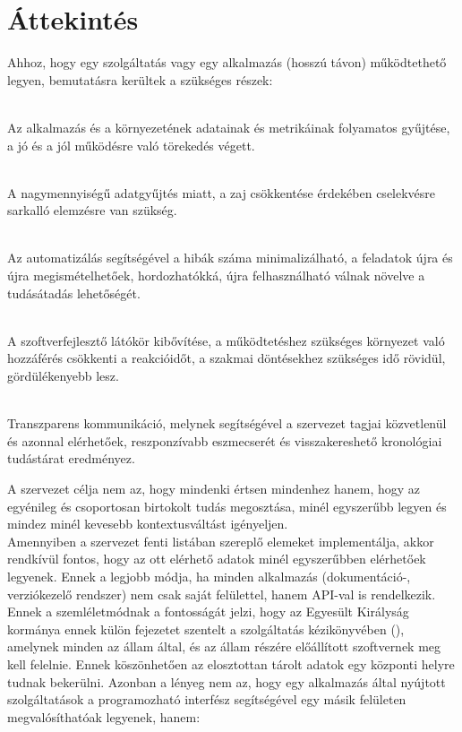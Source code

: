 
\section{Áttekintés}
\label{sect:futureops_overview}
Ahhoz, hogy egy szolgáltatás vagy egy alkalmazás (hosszú távon) működtethető legyen, bemutatásra kerültek a szükséges részek:

\begin{description}
  \label{dsc:important_stuffs}
  \item[Folyamatos adatgyűjtés és értesítés]\hfill\\
  Az alkalmazás és a környezetének adatainak és metrikáinak folyamatos gyűjtése, a jó és a jól működésre való törekedés végett.
  \item[Gyűjtött adatok elemzése]\hfill\\
  A nagymennyiségű adatgyűjtés miatt, a zaj csökkentése érdekében cselekvésre sarkalló elemzésre van szükség.
  \item[Automatizált folyamatok]\hfill\\
  Az automatizálás segítségével a hibák száma minimalizálható, a feladatok újra és újra megismételhetőek, hordozhatókká, újra felhasználható válnak növelve a tudásátadás lehetőségét.
  \item[A rendszerek közti kapcsolatok megértése]\hfill\\
  A szoftverfejlesztő látókör kibővítése, a működtetéshez szükséges környezet való hozzáférés csökkenti a reakcióidőt, a szakmai döntésekhez szükséges idő rövidül, gördülékenyebb lesz.
  \item[Transzparens kommunikáció]\hfill\\
  Transzparens kommunikáció, melynek segítségével a szervezet tagjai közvetlenül és azonnal elérhetőek, reszponzívabb eszmecserét és visszakereshető kronológiai tudástárat eredményez.
\end{description}

{\Large A szervezet célja nem az, hogy mindenki értsen mindenhez hanem, hogy az egyénileg és csoportosan birtokolt tudás megosztása, minél egyszerűbb legyen és mindez minél kevesebb kontextusváltást igényeljen.}
\hfill\\
Amennyiben a szervezet fenti listában szereplő elemeket implementálja, akkor rendkívül fontos, hogy az ott elérhető adatok minél egyszerűbben elérhetőek legyenek. Ennek a legjobb módja, ha minden alkalmazás (dokumentáció-, verziókezelő rendszer) nem csak saját felülettel, hanem API-val is rendelkezik. Ennek a szemléletmódnak a fontosságát jelzi, hogy az Egyesült Királyság kormánya ennek külön fejezetet szentelt a szolgáltatás kézikönyvében (\cite{uk_gov_build_api}), amelynek minden az állam által, és az állam részére előállított szoftvernek meg kell felelnie. Ennek köszönhetően az elosztottan tárolt adatok egy központi helyre tudnak bekerülni. Azonban a lényeg nem az, hogy egy alkalmazás által nyújtott szolgáltatások a programozható interfész segítségével egy másik felületen megvalósíthatóak legyenek, hanem:


